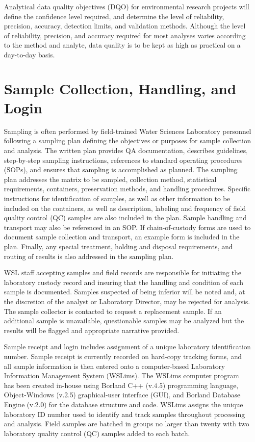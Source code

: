 Analytical data quality objectives (DQO) for environmental research 
projects will define the confidence level required, and determine the 
level of reliability, precision, accuracy, detection limits, and 
validation methods. Although the level of reliability, precision, and 
accuracy required for most analyses varies according to the method and 
analyte, data quality is to be kept as high as practical on a day-to-day 
basis. 



\section{Sample Collection, Handling, and Login}
Sampling is often performed by field-trained Water Sciences 
Laboratory personnel following a sampling plan defining the objectives 
or purposes for sample collection and analysis. The written plan 
provides QA documentation, describes guidelines, step-by-step sampling 
instructions, references to standard operating procedures (SOPs), and 
ensures that sampling is accomplished as planned. The sampling plan 
addresses the matrix to be sampled, collection method, statistical 
requirements, containers, preservation methods, and handling procedures. 
Specific instructions for identification of samples, as well as other 
information to be included on the containers, as well as description, 
labeling and frequency of field quality control (QC) samples are also 
included in the plan. Sample handling and transport may also be 
referenced in an SOP. If chain-of-custody forms are used to document 
sample collection and transport, an example form is included in the 
plan. Finally, any special treatment, holding and disposal requirements, 
and routing of results is also addressed in the sampling plan.

WSL staff accepting samples and field records are responsible for 
initiating the laboratory custody record and insuring that the handling 
and condition of each sample is documented. Samples suspected of being 
inferior will be noted and, at the discretion of the analyst or 
Laboratory Director, may be rejected for analysis. The sample collector 
is contacted to request a replacement sample. If an additional sample is 
unavailable, questionable samples may be analyzed but the results will 
be flagged and appropriate narrative provided.

Sample receipt and login includes assignment of a unique laboratory 
identification number. Sample receipt is currently recorded on hard-copy 
tracking forms, and all sample information is then entered onto a 
computer-based Laboratory Information Management System (WSLims). The 
WSLims computer program has been created in-house using Borland C++ 
(v.4.5) programming language, Object-Windows (v.2.5) graphical-user 
interface (GUI), and Borland Database Engine (v.2.0) for the database 
structure and code. WSLims assigns the unique laboratory ID number used 
to identify and track samples throughout processing and analysis. Field 
samples are batched in groups no larger than twenty with two laboratory 
quality control (QC) samples added to each batch.

